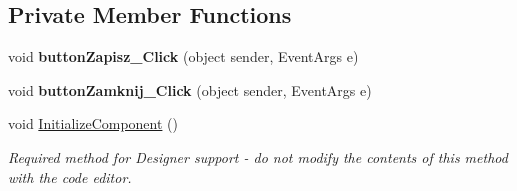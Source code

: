 \subsection*{Private Member Functions}
\begin{DoxyCompactItemize}
\item 
\mbox{\label{class_statystyki___o_s_p_1_1_fireman_form_ae5307b8fc05bc853802ec643314bde9c}} 
void {\bfseries button\+Zapisz\+\_\+\+Click} (object sender, Event\+Args e)
\item 
\mbox{\label{class_statystyki___o_s_p_1_1_fireman_form_a2929f7c2b781254bd283379f13a0ce86}} 
void {\bfseries button\+Zamknij\+\_\+\+Click} (object sender, Event\+Args e)
\item 
void \mbox{\hyperlink{class_statystyki___o_s_p_1_1_fireman_form_a760acdc7c3f9dd972feeff92a49b4ece}{Initialize\+Component}} ()
\begin{DoxyCompactList}\small\item\em Required method for Designer support -\/ do not modify the contents of this method with the code editor. \end{DoxyCompactList}\end{DoxyCompactItemize}
